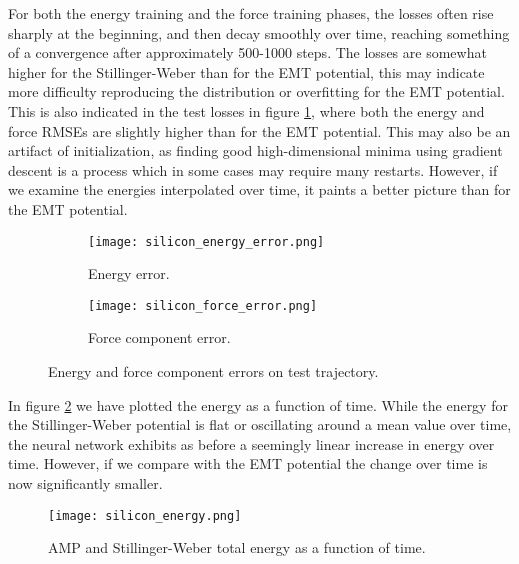 For both the energy training and the force training phases, the 
losses often rise sharply at the beginning, and then decay smoothly over time,
reaching something of a convergence after approximately 500-1000 steps.
The losses are somewhat higher for the Stillinger-Weber than for the
EMT potential, this may indicate more difficulty reproducing the distribution
or overfitting for the EMT potential.
This is also indicated in the test losses in figure \ref{fig:silicon-error},
where both the energy and force RMSEs are slightly higher than for the
EMT potential. This may also be an artifact of initialization, as finding
good high-dimensional minima using gradient descent 
is a process which in some cases may require many restarts.
However, if we examine the energies interpolated over time,
it paints a better picture than for the EMT potential.

\begin{figure}[H]
\begin{adjustbox}{max width=1.2\linewidth,center}
\centering
  \begin{subfigure}[b]{0.55\textwidth}
      \texttt{[image: silicon\_energy\_error.png]}
      \caption{Energy error.}
  \end{subfigure}
  \hfill
  \begin{subfigure}[b]{0.55\textwidth}
      \texttt{[image: silicon\_force\_error.png]}
      \caption{Force component error.}
  \end{subfigure}
\end{adjustbox}
    \caption{Energy and force component errors on test trajectory.}
    \label{fig:silicon-error}
\end{figure}

In figure \ref{fig:silicon-energy} we have plotted the energy as a function
of time. While the energy for the Stillinger-Weber potential 
is flat or oscillating around a mean value over time,
the neural network exhibits as before a seemingly
linear increase in energy over time.
However, if we compare with the EMT potential the change over time 
is now significantly smaller.

\begin{figure}[H]
    \centering
    \texttt{[image: silicon\_energy.png]}
    \caption{AMP and Stillinger-Weber total energy as a function of time.}
    \label{fig:silicon-energy}
\end{figure}

